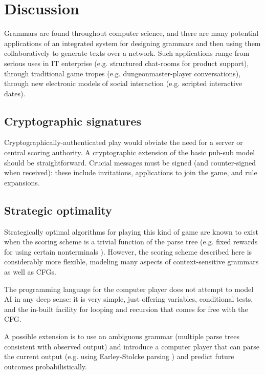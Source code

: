 \documentclass{acm_proc_article-sp}
\begin{document}
\section{Discussion}

Grammars are found throughout computer science,
and there are many potential applications of an
integrated system for designing grammars and then using them collaboratively to generate texts over a network.
Such applications range from
serious uses in IT enterprise (e.g. structured chat-rooms for product support),
through traditional game tropes (e.g. dungeonmaster-player conversations),
through new electronic models of social interaction (e.g. scripted interactive dates).


\subsection{Cryptographic signatures}

Cryptographically-authenticated play would obviate the need for a server or central scoring authority.
A cryptographic extension of the basic pub-sub model should be straightforward.
Crucial messages must be signed (and counter-signed when received):
these include invitations, applications to join the game, and rule expansions.

\subsection{Strategic optimality}

Strategically optimal algorithms for playing this kind of game are known to exist when the scoring scheme is a trivial function of the parse tree (e.g. fixed rewards for using certain nonterminals \cite{DBLP:conf/icalp/EtessamiWY08}).
However, the scoring scheme described here is considerably more flexible, modeling many aspects of context-sensitive grammars as well as CFGs.

The programming language for the computer player does not attempt to model AI in any deep sense:
it is very simple, just offering variables, conditional tests, and the in-built facility for looping and recursion that comes for free with the CFG.

A possible extension is to use an ambiguous grammar (multiple parse trees consistent with observed output)
and introduce a computer player that can parse the current output
(e.g. using Earley-Stolcke parsing \cite{Stolcke:1995:EPC:211190.211197})
and predict future outcomes probabilistically.
\end{document}
